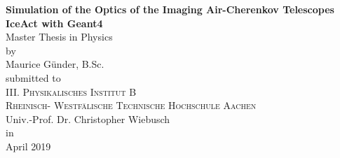 \begin{titlepage}
\addtolength{\oddsidemargin}{4mm}
\begin{center}

\LARGE
\textbf{Simulation of the Optics of the Imaging Air-Cherenkov Telescopes IceAct with Geant4} \\[15mm]

\large
Master Thesis in Physics\\[15mm]

{\large by}\\[1mm]
\LARGE
Maurice Günder, B.Sc.\\[90mm]


{\large submitted to}\\[1mm]
\large
\textsc{III. Physikalisches Institut B \\Rheinisch- Westfälische Technische Hochschule Aachen}\\
Univ.-Prof. Dr. Christopher Wiebusch\\[25mm]

{\large in}\\[1mm]
\large
April 2019

\end{center}
\end{titlepage}